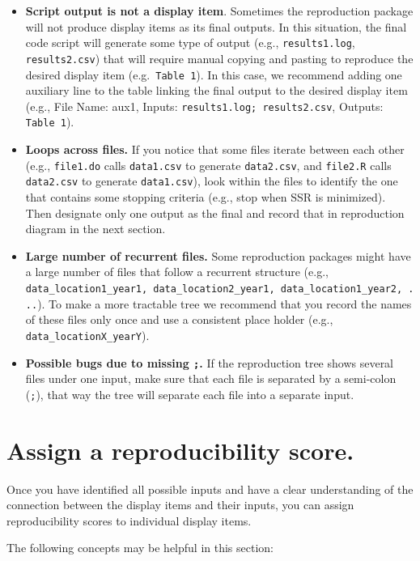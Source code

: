 \documentclass[
  openany]{book}
\begin{document}
\begin{itemize}
\item
  \textbf{Script output is not a display item}. Sometimes the reproduction package will not produce display items as its final outputs. In this situation, the final code script will generate some type of output (e.g., \texttt{results1.log}, \texttt{results2.csv}) that will require manual copying and pasting to reproduce the desired display item (e.g.~\texttt{Table\ 1}). In this case, we recommend adding one auxiliary line to the table linking the final output to the desired display item (e.g., File Name: aux1, Inputs: \texttt{results1.log;\ results2.csv}, Outputs: \texttt{Table\ 1}).
\item
  \textbf{Loops across files.} If you notice that some files iterate between each other (e.g., \texttt{file1.do} calls \texttt{data1.csv} to generate \texttt{data2.csv}, and \texttt{file2.R} calls \texttt{data2.csv} to generate \texttt{data1.csv}), look within the files to identify the one that contains some stopping criteria (e.g., stop when SSR is minimized). Then designate only one output as the final and record that in reproduction diagram in the next section.
\item
  \textbf{Large number of recurrent files.} Some reproduction packages might have a large number of files that follow a recurrent structure (e.g., \texttt{data\_location1\_year1,\ data\_location2\_year1,\ data\_location1\_year2,\ ...}). To make a more tractable tree we recommend that you record the names of these files only once and use a consistent place holder (e.g., \texttt{data\_locationX\_yearY}).
\item
  \textbf{Possible bugs due to missing \texttt{;}.} If the reproduction tree shows several files under one input, make sure that each file is separated by a semi-colon (\texttt{;}), that way the tree will separate each file into a separate input.
\end{itemize}

\hypertarget{score}{%
\section{Assign a reproducibility score.}\label{score}}

Once you have identified all possible inputs and have a clear understanding of the connection between the display items and their inputs, you can assign reproducibility scores to individual display items.

The following concepts may be helpful in this section:
\end{document}
